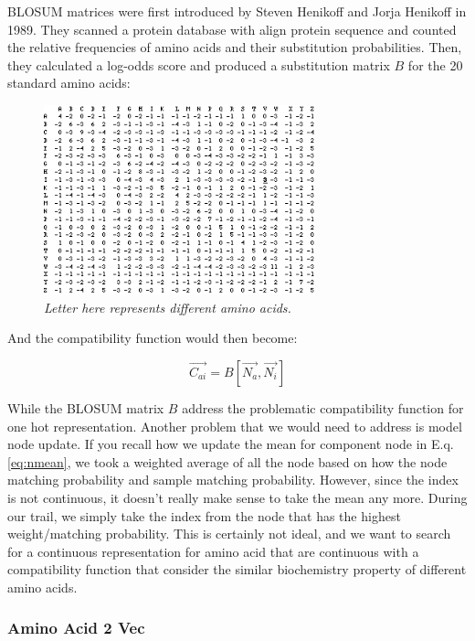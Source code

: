 BLOSUM matrices were first introduced by Steven Henikoff and Jorja Henikoff in 1989. They scanned a protein database with align protein sequence and counted the relative frequencies of amino acids and their substitution probabilities. Then, they calculated a log-odds score and produced a substitution matrix $B$ for the 20 standard amino acids:

\begin{figure}[h]
	\centering
	\captionsetup{justification=centering}
	\includegraphics[width=0.7\textwidth]{figs/blosum.png}
	\caption[Caption for LOF]{\emph{Letter here represents different amino acids.}}
	\label{fig:blosum}
\end{figure}

And the compatibility function would then become:

\begin{equation} 
\overrightarrow{C_{ai}}=B[\overrightarrow{N_a},\overrightarrow{N_i}]
\end{equation}

While the BLOSUM matrix $B$ address the problematic compatibility function for one hot representation. Another problem that we would need to address is model node update. If you recall how we update the mean for component node in E.q. \ref{eq:nmean}, we took a weighted average of all the node based on how the node matching probability and sample matching probability. However, since the index is not continuous, it doesn't really make sense to take the mean any more. During our trail, we simply take the index from the node that has the highest weight/matching probability. This is certainly not ideal, and we want to search for a continuous representation for amino acid that are continuous with a compatibility function that consider the similar biochemistry property of different amino acids.

\subsubsection{Amino Acid 2 Vec}
\label{sssec:a2v}

